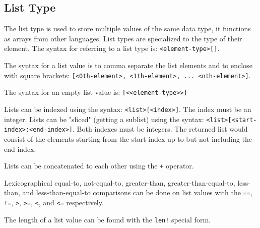 
\subsection{List Type}
{
	The list type is used to store multiple values of the same data type,
	it functions as arrays from other languages.
	List types are specialized to the type of their element.
	The syntax for referring to a list type is: \texttt{<element-type>[]}.
	
	The syntax for a list value is to comma separate the list elements
	and to enclose with square
	brackets: \texttt{[<0th-element>, <1th-element>, ... <nth-element>]}.
	
	The syntax for an empty list value is: \texttt{[<<element-type>>]}
	
	Lists can be indexed using the
	syntax: \texttt{<list>[<index>]}. The
	index must be an integer.
	Lists can be "sliced" (getting a sublist) using
	the syntax: \texttt{<list>[<start-index>:<end-index>]}. Both
	indexes must be integers. The returned list would consist of
	the elements starting from the start index up to but not including
	the end index.
	
	Lists can be concatenated to each other using the \texttt{+} operator.
	
	Lexicographical equal-to, not-equal-to, greater-than, greater-than-equal-to,
	less-than, and less-than-equal-to comparisons
	can be done on list values with
	the \texttt{==}, \texttt{!=},
	\texttt{>}, \texttt{>=}, \texttt{<}, and \texttt{<=} respectively.
	
	The length of a list value can be found with the \texttt{len!} special form.
}




















